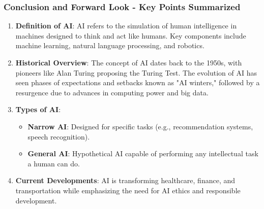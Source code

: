 \documentclass{beamer}
\begin{document}
\begin{frame}[fragile]
    \frametitle{Conclusion and Forward Look - Key Points Summarized}
    \begin{enumerate}
        \item \textbf{Definition of AI}: 
        AI refers to the simulation of human intelligence in machines designed to think and act like humans. Key components include machine learning, natural language processing, and robotics.
        
        \item \textbf{Historical Overview}:
        The concept of AI dates back to the 1950s, with pioneers like Alan Turing proposing the Turing Test. The evolution of AI has seen phases of expectations and setbacks known as "AI winters," followed by a resurgence due to advances in computing power and big data.
        
        \item \textbf{Types of AI}:
        \begin{itemize}
            \item \textbf{Narrow AI}: Designed for specific tasks (e.g., recommendation systems, speech recognition).
            \item \textbf{General AI}: Hypothetical AI capable of performing any intellectual task a human can do.
        \end{itemize}
        
        \item \textbf{Current Developments}:
        AI is transforming healthcare, finance, and transportation while emphasizing the need for AI ethics and responsible development.
    \end{enumerate}
\end{frame}
\end{document}
